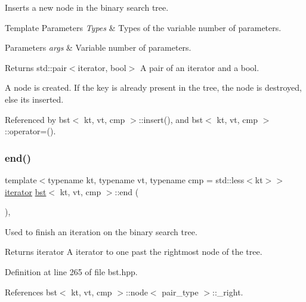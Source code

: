 Inserts a new node in the binary search tree. 


\begin{DoxyTemplParams}{Template Parameters}
{\em Types} & Types of the variable number of parameters. \\
\hline
\end{DoxyTemplParams}

\begin{DoxyParams}{Parameters}
{\em args} & Variable number of parameters. \\
\hline
\end{DoxyParams}
\begin{DoxyReturn}{Returns}
std\+::pair$<$iterator, bool$>$ A pair of an iterator and a bool.
\end{DoxyReturn}
A node is created. If the key is already present in the tree, the node is destroyed, else it\textquotesingle{}s inserted. 

Referenced by bst$<$ kt, vt, cmp $>$\+::insert(), and bst$<$ kt, vt, cmp $>$\+::operator=().

\mbox{\label{classbst_aed3a831efc810b5084cb0c9f4adeb16a}} 
\subsubsection{\texorpdfstring{end()}{end()}\hspace{0.1cm}{\footnotesize\ttfamily [1/2]}}
{\footnotesize\ttfamily template$<$typename kt, typename vt, typename cmp = std\+::less$<$kt$>$$>$ \\
\hyperlink{classbst_a429b0445783ff6486882db5dee900ce0}{iterator} \hyperlink{classbst}{bst}$<$ kt, vt, cmp $>$\+::end (\begin{DoxyParamCaption}{ }\end{DoxyParamCaption})\hspace{0.3cm}{\ttfamily [inline]}, {\ttfamily [noexcept]}}



Used to finish an iteration on the binary search tree. 

\begin{DoxyReturn}{Returns}
iterator A iterator to one past the rightmost node of the tree. 
\end{DoxyReturn}


Definition at line 265 of file bst.\+hpp.



References bst$<$ kt, vt, cmp $>$\+::node$<$ pair\+\_\+type $>$\+::\+\_\+right.

